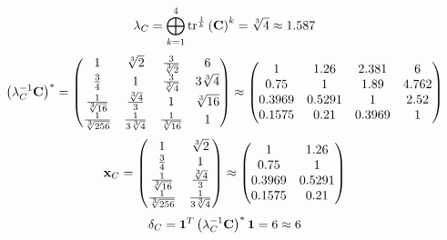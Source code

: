 \documentclass[10pt,a4paper]{article}
\begin{document}
	\[
		\lambda_{C} =  \bigoplus ^{4} _{k = 1} \operatorname{tr} ^{\frac 1 k} \left( \bold{C} \right)^k = {\sqrt[3]{4}} {}\approx 1.587
	\]
	\[
		\left(\lambda_{C}^{-1}\bold{C}\right)^* = 
		\begin{pmatrix}
			{1} {} & {\sqrt[3]{2}} {} & \frac{{3}} {\sqrt[3]{2}} & {{6}} {} \\
			\frac{{3}} {{4}} & {1} {} & \frac{{3}} {\sqrt[3]{4}} & {{3}\sqrt[3]{4}} {} \\
			\frac{1} {\sqrt[3]{16}} & \frac{\sqrt[3]{4}} {{3}} & {1} {} & {\sqrt[3]{16}} {} \\
			\frac{1} {\sqrt[3]{256}} & \frac{1} {{3}\sqrt[3]{4}} & \frac{1} {\sqrt[3]{16}} & {1} {} \\
		\end{pmatrix}
		\approx
		\begin{pmatrix}
			1        & 1.26     & 2.381    & 6        \\
			0.75     & 1        & 1.89     & 4.762    \\
			0.3969   & 0.5291   & 1        & 2.52     \\
			0.1575   & 0.21     & 0.3969   & 1        \\
		\end{pmatrix}
	\]
	\[
		\bold{x}_{C} = 
		\begin{pmatrix}
			{1} {} & {\sqrt[3]{2}} {} \\
			\frac{{3}} {{4}} & {1} {} \\
			\frac{1} {\sqrt[3]{16}} & \frac{\sqrt[3]{4}} {{3}} \\
			\frac{1} {\sqrt[3]{256}} & \frac{1} {{3}\sqrt[3]{4}} \\
		\end{pmatrix}
		\approx
		\begin{pmatrix}
			1        & 1.26     \\
			0.75     & 1        \\
			0.3969   & 0.5291   \\
			0.1575   & 0.21     \\
		\end{pmatrix}
	\]
	\[
		\delta_{C} = \bold{1}^T \left(\lambda_{C}^{-1}\bold{C}\right)^* \bold{1} = {{6}} {}\approx 6
	\]
\end{document}
